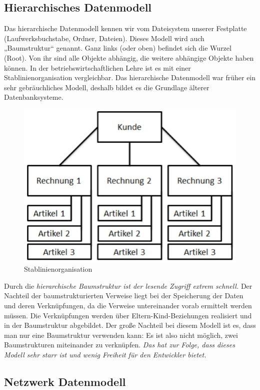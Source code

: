 \subsection{Hierarchisches Datenmodell}

Das hierarchische Datenmodell kennen wir vom Dateisystem unserer Festplatte (Laufwerksbuchstabe, Ordner, Dateien). Dieses Modell wird auch „Baumstruktur“ genannt. Ganz links (oder oben) befindet sich die Wurzel (Root). Von ihr sind alle Objekte abhängig, die weitere abhängige Objekte haben können. In der betriebswirtschaftlichen Lehre ist es mit einer Stablinienorganisation vergleichbar. Das hierarchische Datenmodell war früher ein sehr gebräuchliches Modell, deshalb bildet es die Grundlage älterer Datenbanksysteme.

\begin{figure}[H]
    \centering
    \includegraphics[width=.75\textwidth]{Content/images/modellierung/stablinien.png}
    \caption{Stablinienorganisation}
    \label{fig:modellierung:stablinien}
 \end{figure}

 Durch die \emph{hierarchische Baumstruktur ist der lesende Zugriff extrem schnell.} Der Nachteil der baumstrukturierten Verweise liegt bei der Speicherung der Daten und deren Verknüpfungen, da die Verweise untereinander vorab ermittelt werden müssen. Die Verknüpfungen werden über Eltern-Kind-Beziehungen realisiert und in der Baumstruktur abgebildet. Der große Nachteil bei diesem Modell ist es, dass man nur eine Baumstruktur verwenden kann: Es ist also nicht möglich, zwei Baumstrukturen miteinander zu verknüpfen. \emph{Das hat zur Folge, dass dieses Modell sehr starr ist und wenig Freiheit für den Entwickler bietet. }

 \subsection{Netzwerk Datenmodell}

